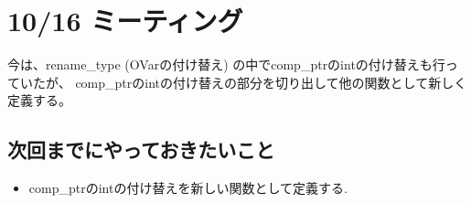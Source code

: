 \documentclass[a4j,proof]{jarticle}
\begin{document}
\section{10/16 ミーティング}
今は、rename\_type (OVarの付け替え) の中でcomp\_ptrのintの付け替えも行っていたが、
comp\_ptrのintの付け替えの部分を切り出して他の関数として新しく定義する。

\subsection{次回までにやっておきたいこと}
\begin{itemize}
  \item comp\_ptrのintの付け替えを新しい関数として定義する.
\end{itemize}
\end{document}
